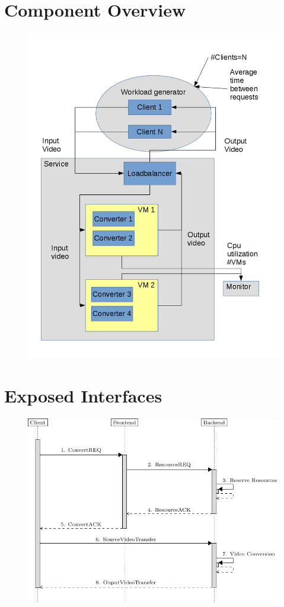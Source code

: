 \documentclass[]{article}
\begin{document}
\section*{Component Overview}
	\begin{figure}[h]
	\centering
	\includegraphics[width=\linewidth]{system_diagram}
	\caption{}
	\label{fig:system_diagram}
	\end{figure}
\section*{Exposed Interfaces}
	\begin{figure}[h]
	\centering
	\includegraphics[width=\linewidth]{sequence_diagram}
	\caption{}
	\label{fig:sequence_diagram}
	\end{figure}
	
\end{document}

